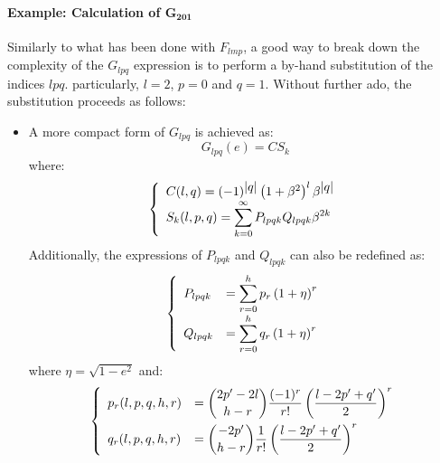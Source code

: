 			\paragraph{Example: Calculation of $\bm{G_{201}}$\\}
			\indent Similarly to what has been done with $F_{lmp}$, a good way to break down the complexity of the $G_{lpq}$ expression is to perform a by-hand substitution of the indices $lpq$. particularly, $l = 2$, $p = 0$ and $q = 1$. Without further ado, the substitution proceeds as follows:
			\begin{itemize}
			\item[\GMVred{Step 1. }]  A more compact form of $G_{lpq}$ is achieved as:
			\begin{equation}
			G_{lpq}(e) =  C S_{k}
			\label{eq:Simp_G_lpq}
			\end{equation}
			\noindent where:
			\begin{equation}
			\left\{ \begin{array}{ll}
			C(l, q) = (-1)^{\mbox{$\left\lvert q \right\rvert$}}\left( 1 + \beta^2\right)^l \beta^{\mbox{$\left\lvert q \right\rvert$}}\\
			S_k(l, p, q) = \displaystyle\sum_{k=0}^{\infty} P_{lpqk}Q_{lpqk}\beta^{2k} 
			\end{array}\right.
			\label{eq:Simp_G_lpq_V2}
			\end{equation}
			\indent Additionally, the expressions of $P_{lpqk}$ and $Q_{lpqk}$ can also be redefined as:
			\begin{equation}
			\left\{ \begin{array}{ll}
			P_{lpqk} & = \displaystyle\sum_{r = 0}^h p_r  \left( 1 + \eta \right)^r\\[1em]
			Q_{lpqk} & = \displaystyle\sum_{r = 0}^h q_r  \left( 1 + \eta \right)^r
			\end{array}\right.
			\label{eq:PQ_simp}
			\end{equation}
			\noindent where $\eta = \sqrt{1 - e^2}$ and:
			\begin{equation}
			\left\{ \begin{array}{ll}
			p_r(l, p, q, h, r) & =  \dbinom{ 2 p' - 2 l} {h - r} \dfrac{(-1)^r}{r!} \left( \dfrac{l - 2p' + q'}{2}\right)^r\\[1em]
			q_r(l, p, q, h, r) & =  \dbinom{ -2 p'} {h - r} \dfrac{1}{r!} \left( \dfrac{l - 2p' + q'}{2}\right)^r\\
			\end{array}\right.
			\label{eq:pq_coeffs}
			\end{equation}

\end{itemize}
